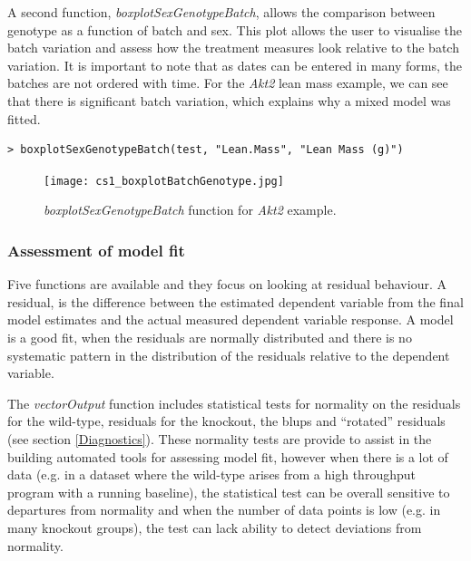 \documentclass[12pt,a4paper]{article}
\begin{document}
A second function, \textit{boxplotSexGenotypeBatch}, allows the comparison between genotype as a function of batch and sex.  
This plot allows the user to visualise the batch variation and assess how the treatment measures look relative to the batch variation. 
It is important to note that as dates can be entered in many forms, the batches are not ordered with time. 
For the \textit{Akt2} lean mass example, we can see that there is significant batch variation, which explains why a mixed model was fitted.

\begingroup
    \fontsize{8pt}{12pt}\selectfont
\begin{verbatim}
> boxplotSexGenotypeBatch(test, "Lean.Mass", "Lean Mass (g)")
\end{verbatim}
\endgroup 

\begin{figure}[H]%
\centerline{\texttt{[image: cs1\_boxplotBatchGenotype.jpg]}}
\caption{\textit{boxplotSexGenotypeBatch} function for \textit{Akt2} example.}\label{fig:16}
\end{figure}

\subsubsection{Assessment of model fit}

Five functions are available and they focus on looking at residual behaviour. 
A residual, is the difference between the estimated dependent variable from the final model estimates and the actual measured dependent variable response. 
A model is a good fit, when the residuals are normally distributed and there is no systematic pattern in the distribution of the residuals relative to the dependent variable. 

The \textit{vectorOutput} function includes statistical tests for normality on the residuals for the wild-type, residuals for the knockout, the blups and ``rotated'' residuals (see section \ref{Diagnostics}). 
These normality tests are provide to assist in the building automated tools for assessing model fit, 
however when there is a lot of data (e.g. in a dataset where the wild-type arises from a high throughput program with a running baseline), 
the statistical test can be overall sensitive to departures from normality and when the number of data points is low (e.g. in many knockout groups), the test can lack ability to detect deviations from normality. 
\end{document}
